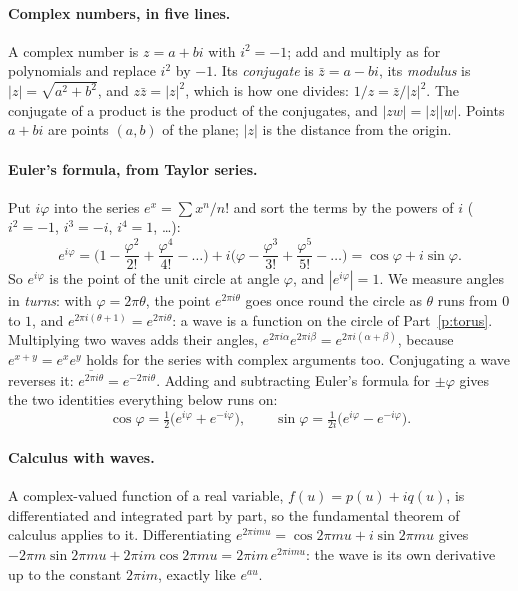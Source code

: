 \documentclass[10pt]{article}
\theoremstyle{plain}
\theoremstyle{definition}
\begin{document}
\paragraph{Complex numbers, in five lines.}
A complex number is $z=a+bi$ with $i^2=-1$; add and multiply as for
polynomials and replace $i^2$ by $-1$. Its \emph{conjugate} is
$\bar z=a-bi$, its \emph{modulus} is $|z|=\sqrt{a^2+b^2}$, and
$z\bar z=|z|^2$, which is how one divides: $1/z=\bar z/|z|^2$. The
conjugate of a product is the product of the conjugates, and $|zw|=|z||w|$.
Points $a+bi$ are points $(a,b)$ of the plane; $|z|$ is the distance from
the origin.

\paragraph{Euler's formula, from Taylor series.}
Put $i\varphi$ into the series $e^x=\sum x^n/n!$ and sort the terms by the
powers of $i$ ($i^2=-1$, $i^3=-i$, $i^4=1$, \dots):
\[
  e^{i\varphi}=\Big(1-\frac{\varphi^2}{2!}+\frac{\varphi^4}{4!}-\dots\Big)
  +i\Big(\varphi-\frac{\varphi^3}{3!}+\frac{\varphi^5}{5!}-\dots\Big)
  =\cos\varphi+i\sin\varphi .
\]
So $e^{i\varphi}$ is the point of the unit circle at angle $\varphi$, and
$|e^{i\varphi}|=1$. We measure angles in \emph{turns}: with
$\varphi=2\pi\theta$, the point $e^{2\pi i\theta}$ goes once round the circle
as $\theta$ runs from $0$ to $1$, and $e^{2\pi i(\theta+1)}=e^{2\pi i\theta}$:
a wave is a function on the circle of Part~\ref{p:torus}. Multiplying two
waves adds their angles, $e^{2\pi i\alpha}e^{2\pi i\beta}=e^{2\pi i(\alpha+\beta)}$,
because $e^{x+y}=e^xe^y$ holds for the series with complex arguments too.
Conjugating a wave reverses it: $\overline{e^{2\pi i\theta}}=e^{-2\pi i\theta}$.
Adding and subtracting Euler's formula for $\pm\varphi$ gives the two
identities everything below runs on:
\[
  \cos\varphi=\tfrac12\big(e^{i\varphi}+e^{-i\varphi}\big),\qquad
  \sin\varphi=\tfrac1{2i}\big(e^{i\varphi}-e^{-i\varphi}\big).
\]

\paragraph{Calculus with waves.}
A complex-valued function of a real variable, $f(u)=p(u)+iq(u)$, is
differentiated and integrated part by part, so the fundamental theorem of
calculus applies to it. Differentiating $e^{2\pi imu}=\cos2\pi mu+i\sin2\pi mu$
gives $-2\pi m\sin2\pi mu+2\pi im\cos2\pi mu=2\pi im\,e^{2\pi imu}$: the wave
is its own derivative up to the constant $2\pi im$, exactly like $e^{au}$.
\end{document}
